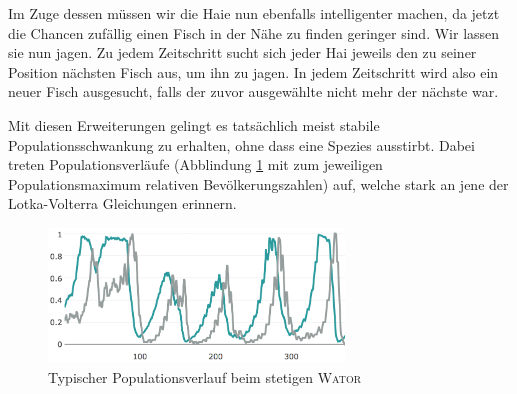 \documentclass[a4paper,11pt]{article}
\newcommand{\wator}{\textsc{Wator}}
\theoremstyle{definition}
\numberwithin{equation}{section}
\begin{document}
	Im Zuge dessen müssen wir die Haie nun ebenfalls intelligenter machen, da jetzt die Chancen zufällig einen Fisch in der Nähe zu finden geringer sind. Wir lassen sie nun jagen. Zu jedem Zeitschritt sucht sich jeder Hai jeweils den zu seiner Position nächsten Fisch aus, um ihn zu jagen. In jedem Zeitschritt wird also ein neuer Fisch ausgesucht, falls der zuvor ausgewählte nicht mehr der nächste war.\newline
	
	Mit diesen Erweiterungen gelingt es tatsächlich meist stabile Populationsschwankung zu erhalten, ohne dass eine Spezies ausstirbt.
	Dabei treten Populationsverläufe (Abblindung \ref{fig:continuous_diagram} mit zum jeweiligen Populationsmaximum relativen Bevölkerungszahlen) auf, welche stark an jene der Lotka-Volterra Gleichungen erinnern.
	
	\begin{figure}
	\centering
	\includegraphics[width=0.7\textwidth]{pictures/continuous_diagram.png}
		\caption{Typischer Populationsverlauf beim stetigen \wator}
		\label{fig:continuous_diagram}
	\end{figure}
	
	\listoffigures
	

	\nocite{*}
	\printbibliography[heading=bibintoc]%
	
\end{document}

